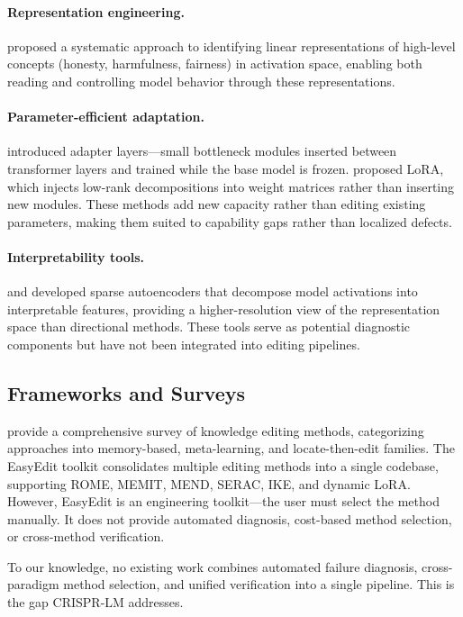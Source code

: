 \documentclass[11pt]{article}
\begin{document}
\paragraph{Representation engineering.} \citet{zou2023representation} proposed a systematic approach to identifying linear representations of high-level concepts (honesty, harmfulness, fairness) in activation space, enabling both reading and controlling model behavior through these representations.

\paragraph{Parameter-efficient adaptation.} \citet{houlsby2019parameter} introduced adapter layers---small bottleneck modules inserted between transformer layers and trained while the base model is frozen. \citet{hu2022lora} proposed LoRA, which injects low-rank decompositions into weight matrices rather than inserting new modules. These methods add new capacity rather than editing existing parameters, making them suited to capability gaps rather than localized defects.

\paragraph{Interpretability tools.} \citet{bricken2023monosemanticity} and \citet{templeton2024scaling} developed sparse autoencoders that decompose model activations into interpretable features, providing a higher-resolution view of the representation space than directional methods. These tools serve as potential diagnostic components but have not been integrated into editing pipelines.

\subsection{Frameworks and Surveys}

\citet{wang2024survey} provide a comprehensive survey of knowledge editing methods, categorizing approaches into memory-based, meta-learning, and locate-then-edit families. The EasyEdit toolkit \citep{wang2024easyedit} consolidates multiple editing methods into a single codebase, supporting ROME, MEMIT, MEND, SERAC, IKE, and dynamic LoRA. However, EasyEdit is an engineering toolkit---the user must select the method manually. It does not provide automated diagnosis, cost-based method selection, or cross-method verification.

To our knowledge, no existing work combines automated failure diagnosis, cross-paradigm method selection, and unified verification into a single pipeline. This is the gap CRISPR-LM addresses.
\end{document}
